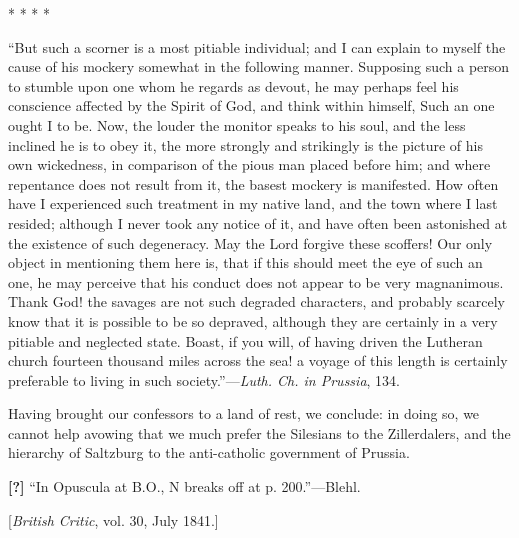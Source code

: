 *
*
*
*

``But such a scorner is a most
pitiable individual; and I can explain to myself the cause of his
mockery somewhat in the following manner. Supposing such a person to
stumble upon one whom he regards as devout, he may perhaps feel his
conscience affected by the Spirit of God, and think within himself, Such
an one ought I to be. Now, the louder the monitor speaks to his soul,
and the less inclined he is to obey it, the more strongly and strikingly
is the picture of his own wickedness, in comparison of the pious man
placed before him; and where repentance does not result from it, the
basest mockery is manifested. How often have I experienced such
treatment in my native land, and the town where I last resided; although
I never took any notice of it, and have often been astonished at the
existence of such degeneracy. May the Lord forgive these scoffers! Our
only object in mentioning them here is, that if this should meet the eye
of such an one, he may perceive that his conduct does not appear to be
very magnanimous. Thank God! the savages are not such degraded
characters, and probably scarcely know that it is possible to be so
depraved, although they are certainly in a very pitiable and neglected
state. Boast, if you will, of having driven the Lutheran church fourteen
thousand miles across the sea! a voyage of this length is certainly
preferable to living in such society.''—\emph{Luth. Ch. in Prussia},
134.

Having brought our confessors to a land of rest, we
conclude: in doing so, we cannot help avowing that we much prefer the
Silesians to the Zillerdalers, and the hierarchy of Saltzburg to the
anti-catholic government of Prussia.


\textbf{[?]} ``In
Opuscula at B.O., N breaks off at p. 200.''—Blehl.

[\emph{British Critic}, vol. 30, July 1841.]

